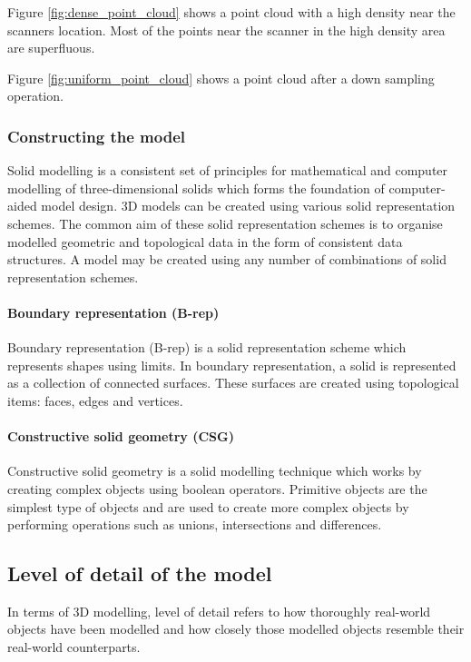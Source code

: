 \documentclass[11pt,a4paper]{report}
\begin{document}
						Figure \ref{fig:dense_point_cloud} shows a point cloud with a high density near the scanners location. Most of the points near the scanner in the high density area are superfluous.
						
						Figure \ref{fig:uniform_point_cloud} shows a point cloud after a down sampling operation.
				
			\subsubsection{Constructing the model}
				Solid modelling is a consistent set of principles for mathematical and computer modelling of three-dimensional solids which forms the foundation of computer-aided model design. 
				\cite{vadim_shapiro_solid_2001}
				3D models can be created using various solid representation schemes. The common aim of these solid representation schemes is to organise modelled geometric and topological data in the form of consistent data structures. A model may be created using any number of combinations of solid representation schemes.
				
				\paragraph{Boundary representation (B-rep)}
					Boundary representation (B-rep) is a solid representation scheme which represents shapes using limits. In boundary representation, a solid is represented as a collection of connected surfaces. These surfaces are created using topological items: faces, edges and vertices.
					\cite{hongxin_zhang_introduction_2007}
				
				\paragraph{Constructive solid geometry (CSG)}
					Constructive solid geometry is a solid modelling technique which works by creating complex objects using boolean operators. Primitive objects are the simplest type of objects and are used to create more complex objects by performing operations such as unions, intersections and differences.
					\cite{foley_computer_1996}
				
		\subsection{Level of detail of the model}
			In terms of 3D modelling, level of detail refers to how thoroughly real-world objects have been modelled and how closely those modelled objects resemble their real-world counterparts.
			
\end{document}
